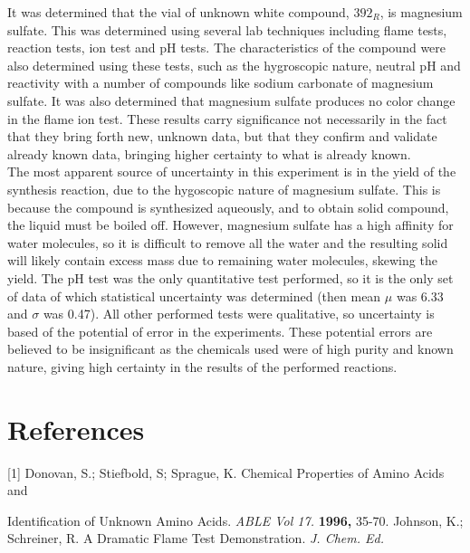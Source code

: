 \documentclass[12pt]{article}
\begin{document}
It was determined that the vial of unknown white compound, \(392_R\), is magnesium sulfate. This was determined using several lab techniques including flame tests, reaction tests, ion test and pH tests. The characteristics of the compound were also determined using these tests, such as the hygroscopic nature, neutral pH and reactivity with a number of compounds like sodium carbonate of magnesium sulfate. It was also determined that magnesium sulfate produces no color change in the flame ion test. These results carry significance not necessarily in the fact that they bring forth new, unknown data, but that they confirm and validate already known data, bringing higher certainty to what is already known.
\vspace{6pt}\\The most apparent source of uncertainty in this experiment is in the yield of the synthesis reaction, due to the hygoscopic nature of magnesium sulfate. This is because the compound is synthesized aqueously, and to obtain solid compound, the liquid must be boiled off. However, magnesium sulfate has a high affinity for water molecules, so it is difficult to remove all the water and the resulting solid will likely contain excess mass due to remaining water molecules, skewing the yield. The pH test was the only quantitative test performed, so it is the only set of data of which statistical uncertainty was determined (then mean $\mu$ was 6.33 and $\sigma$ was 0.47). All other performed tests were qualitative, so uncertainty is based of the potential of error in the experiments. These potential errors are believed to be insignificant as the chemicals used were of high purity and known nature, giving high certainty in the results of the performed reactions.

\section*{References} \nonumber

[1]\hspace{4ex} Donovan, S.; Stiefbold, S; Sprague, K. Chemical Properties of Amino Acids and 

\hspace{12ex}
Identification of Unknown Amino Acids. \textit{ABLE Vol 17.} \textbf{1996,} 35-70.
\vspace{6pt}\newline
[2]\hspace{4ex} Johnson, K.; Schreiner, R. A Dramatic Flame Test Demonstration. \textit{J. Chem. Ed.}
\end{document}
